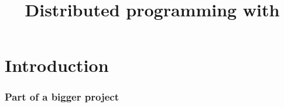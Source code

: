 \documentclass[compress,table,xcolor=table]{beamer}
\begin{document}
\title{Distributed programming with }
\section{Introduction}
\frame{\titlepage}
\begin{frame}
  \Huge
\end{frame}
\begin{frame}
  \frametitle{Part of a bigger project}
\end{frame}
\end{document}

